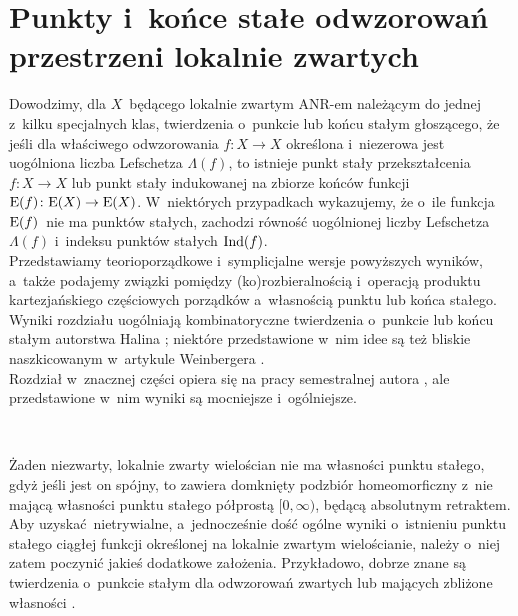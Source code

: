 \chapter{Punkty i~końce stałe odwzorowań przestrzeni lokalnie zwartych}\label{chap4}
\begin{center}
\begin{minipage}{14cm}
{\small Dowodzimy, dla $X$~będącego lokalnie zwartym ANR-em należącym do jednej z~kilku specjalnych klas, twierdzenia o~punkcie lub końcu stałym głoszącego, że jeśli dla właściwego odwzorowania $f\colon X\to X$ określona i~niezerowa jest uogólniona liczba Lefschetza $\Lambda(f)$, to istnieje punkt stały przekształcenia $f\colon X\to X$ lub punkt stały indukowanej na zbiorze końców funkcji $\mathrm{E}(f)\colon \mathrm{E}(X)\to\mathrm{E}(X)$. W~niektórych przypadkach wykazujemy, że o~ile funkcja $\mathrm{E}(f)$~nie ma punktów stałych, zachodzi równość uogólnionej liczby Lefschetza $\Lambda(f)$ i~indeksu punktów stałych $\operatorname{Ind}(f)$.\\

Przedstawiamy teorioporządkowe i~symplicjalne wersje powyższych wyników, a~także podajemy związki pomiędzy (ko)rozbieralnością i~operacją produktu kartezjańskiego częściowych porządków a~własnością punktu lub końca stałego.\\

Wyniki rozdziału uogólniają kombinatoryczne twierdzenia o~punkcie lub końcu stałym autorstwa Halina \cite{Halin73}; niektóre przedstawione w~nim idee są też bliskie naszkicowanym w~artykule Weinbergera \cite{Weinberger09}.\\

Rozdział w~znacznej części opiera się na pracy semestralnej autora \cite{Kukiela12}, ale przedstawione w~nim wyniki są mocniejsze i~ogólniejsze.}
\end{minipage}\\[1.7cm]
\end{center}



Żaden niezwarty, lokalnie zwarty wielościan nie ma własności punktu stałego, gdyż jeśli jest on spójny, to zawiera domknięty podzbiór homeomorficzny z~nie mającą własności punktu stałego półprostą $[0,\infty)$, będącą absolutnym retraktem. Aby uzyskać~nietrywialne, a~jednocześnie dość ogólne wyniki o~istnieniu punktu stałego ciągłej funkcji określonej na lokalnie zwartym wielościanie, należy o~niej zatem poczynić jakieś dodatkowe założenia. Przykładowo, dobrze znane są twierdzenia o~punkcie stałym dla odwzorowań zwartych lub mających zbliżone własności \cite{Gorniewicz05}. 

